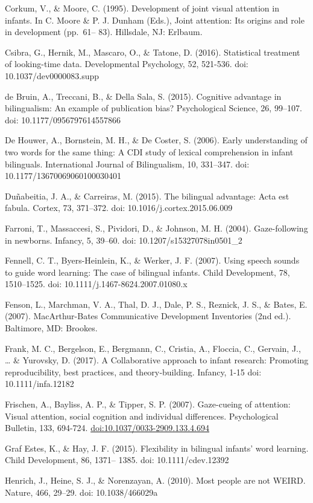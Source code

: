 \documentclass[,man,floatsintext]{apa6}
\begin{document}
Corkum, V., \& Moore, C. (1995). Development of joint visual attention in infants. In C. Moore \& P. J. Dunham (Eds.), Joint attention: Its origins and role in development (pp.~61-- 83). Hillsdale, NJ: Erlbaum.

Csibra, G., Hernik, M., Mascaro, O., \& Tatone, D. (2016). Statistical treatment of looking-time data. Developmental Psychology, 52, 521-536. doi: 10.1037/dev0000083.supp

de Bruin, A., Treccani, B., \& Della Sala, S. (2015). Cognitive advantage in bilingualism: An example of publication bias? Psychological Science, 26, 99--107. doi: 10.1177/0956797614557866

De Houwer, A., Bornstein, M. H., \& De Coster, S. (2006). Early understanding of two words for the same thing: A CDI study of lexical comprehension in infant bilinguals. International Journal of Bilingualism, 10, 331--347. doi: 10.1177/13670069060100030401

Duñabeitia, J. A., \& Carreiras, M. (2015). The bilingual advantage: Acta est fabula. Cortex, 73, 371--372. doi: 10.1016/j.cortex.2015.06.009

Farroni, T., Massaccesi, S., Pividori, D., \& Johnson, M. H. (2004). Gaze-following in newborns. Infancy, 5, 39--60. doi: 10.1207/s15327078in0501\_2

Fennell, C. T., Byers-Heinlein, K., \& Werker, J. F. (2007). Using speech sounds to guide word learning: The case of bilingual infants. Child Development, 78, 1510--1525. doi: 10.1111/j.1467-8624.2007.01080.x

Fenson, L., Marchman, V. A., Thal, D. J., Dale, P. S., Reznick, J. S., \& Bates, E. (2007). MacArthur-Bates Communicative Development Inventories (2nd ed.). Baltimore, MD: Brookes.

Frank, M. C., Bergelson, E., Bergmann, C., Cristia, A., Floccia, C., Gervain, J., \ldots{} \& Yurovsky, D. (2017). A Collaborative approach to infant research: Promoting reproducibility, best practices, and theory‐building. Infancy, 1-15 doi: 10.1111/infa.12182

Frischen, A., Bayliss, A. P., \& Tipper, S. P. (2007). Gaze-cueing of attention: Visual attention, social cognition and individual differences. Psychological Bulletin, 133, 694-724. \url{doi:10.1037/0033-2909.133.4.694}

Graf Estes, K., \& Hay, J. F. (2015). Flexibility in bilingual infants' word learning. Child Development, 86, 1371-- 1385. doi: 10.1111/cdev.12392

Henrich, J., Heine, S. J., \& Norenzayan, A. (2010). Most people are not WEIRD. Nature, 466, 29--29. doi: 10.1038/466029a
\end{document}
